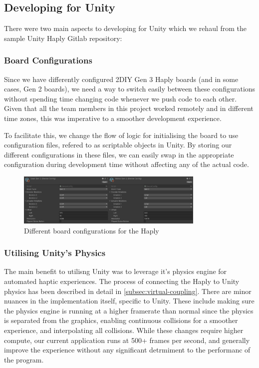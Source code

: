 \subsection{Developing for Unity}
There were two main aspects to developing for Unity which we rehaul from the sample Unity Haply Gitlab repository:
\subsubsection{Board Configurations}
Since we have differently configured 2DIY Gen 3 Haply boards (and in some cases, Gen 2 boards), we need a way to switch easily between these configurations without spending time changing code whenever we push code to each other. Given that all the team members in this project worked remotely and in different time zones, this was imperative to a smoother development experience. 

To facilitate this, we change the flow of logic for initialising the board to use configuration files, refered to as scriptable objects in Unity. By storing our different configurations in these files, we can easily swap in the appropriate configuration during development time without affecting any of the actual code.

\begin{figure}
    \centering
    \includegraphics[width = 0.8\textwidth]{images/board-config.png}
    \caption{Different board configurations for the Haply}
    \label{fig:board-config}
\end{figure}

\subsubsection{Utilising Unity's Physics}
The main benefit to utilisng Unity was to leverage it's physics engine for automated haptic experiences. The process of connecting the Haply to Unity physics has been described in detail in \ref{subsec:virtual-coupling}. There are minor nuances in  the implementation itself, specific to Unity. These include making sure the physics engine is running at a higher framerate than normal since the physics is separated from the graphics, enabling continuous collisions for a smoother experience, and interpolating all collisions. While these changes require higher compute, our current application runs at 500+ frames per second, and generally improve the experience without any significant detrmiment to the performanc of the program.

